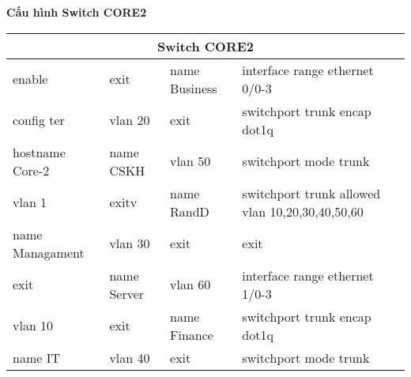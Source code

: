 \textbf{Cấu hình Switch CORE2}
\begin{table}[H]
\centering
\begin{tabular}{|p{4cm}|p{4cm}|p{4cm}|p{4cm}|}
\hline
\multicolumn{4}{|c|}{Switch CORE2} \\
\hline
enable	&exit	&name Business	&interface range ethernet 0/0-3\\
config ter&	vlan 20&	exit&	switchport trunk encap dot1q\\
hostname Core-2	&name CSKH	&vlan 50&	switchport mode trunk\\
vlan 1&	exitv	&name RandD&	switchport trunk allowed vlan 10,20,30,40,50,60\\
name Managament&	vlan 30&	exit	&exit\\
exit	&name Server	&vlan 60	&interface range ethernet 1/0-3\\
vlan 10&	exit&	name Finance&	switchport trunk encap dot1q\\
name IT&	vlan 40	&exit	&switchport mode trunk\\
\hline
\end{tabular}
\end{table}
\newpage
